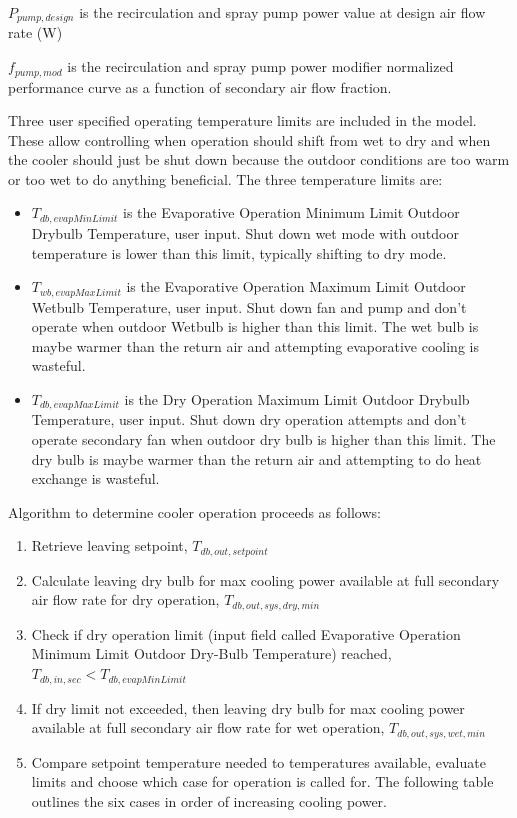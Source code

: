 \(P_{pump,design}\) is the recirculation and spray pump power value at design air flow rate (W)

\(f_{pump,mod}\) is the recirculation and spray pump power modifier normalized performance curve as a function of secondary air flow fraction.

Three user specified operating temperature limits are included in the model. These allow controlling when operation should shift from wet to dry and when the cooler should just be shut down because the outdoor conditions are too warm or too wet to do anything beneficial.  The three temperature limits are:

\begin{itemize}
\item \(T_{db,evapMinLimit}\) is the Evaporative Operation Minimum Limit Outdoor Drybulb Temperature, user input. Shut down wet mode with outdoor temperature is lower than this limit, typically shifting to dry mode.
\item \(T_{wb,evapMaxLimit}\) is the Evaporative Operation Maximum Limit Outdoor Wetbulb Temperature, user input. Shut down fan and pump and don't operate when outdoor Wetbulb is higher than this limit. The wet bulb is maybe warmer than the return air and attempting evaporative cooling is wasteful.
\item \(T_{db,evapMaxLimit}\) is the Dry Operation Maximum Limit Outdoor Drybulb Temperature, user input. Shut down dry operation attempts and don't operate secondary fan when outdoor dry bulb is higher than this limit. The dry bulb is maybe warmer than the return air and attempting to do heat exchange is wasteful.
\end{itemize}

Algorithm to determine cooler operation proceeds as follows:

\begin{enumerate}
\def\labelenumi{\arabic{enumi}.}
\item
  Retrieve leaving setpoint, \(T_{db,out,setpoint}\)
\item
  Calculate leaving dry bulb for max cooling power available at full secondary air flow rate for dry operation, \(T_{db,out,sys,dry,min}\)
\item
  Check if dry operation limit (input field called Evaporative Operation Minimum Limit Outdoor Dry-Bulb Temperature) reached, \(T_{db,in,sec}<T_{db,evapMinLimit}\)
\item
  If dry limit not exceeded, then leaving dry bulb for max cooling power available at full secondary air flow rate for wet operation, \(T_{db,out,sys,wet,min}\)
\item
  Compare setpoint temperature needed to temperatures available, evaluate limits and choose which case for operation is called for. The following table outlines the six cases in order of increasing cooling power.
\end{enumerate}

